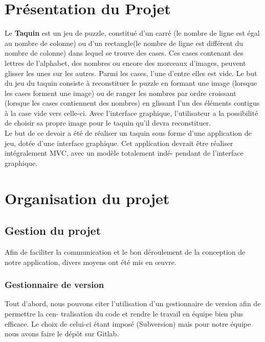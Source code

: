 \documentclass[12pt]{article}
\begin{document}
\tableofcontents
\newpage

\section{Présentation du Projet}
Le \textbf{Taquin} est un jeu de puzzle, constitué d’un carré (le nombre de ligne est égal au nombre de colonne) ou d'un rectangle(le nombre de ligne est différent du nombre de colonne) dans lequel se trouve des cases. Ces cases
contenant des lettres de l’alphabet, des nombres ou encore des morceaux d’images, peuvent glisser les
unes sur les autres. Parmi les cases, l’une d’entre elles est vide. Le but du jeu du taquin consiste à
reconstituer le puzzle en formant une image (lorsque les cases forment une image) ou de ranger les
nombres par ordre croissant (lorsque les cases contiennent des nombres) en glissant l’un des éléments
contigus à la case vide vers celle-ci. Avec l’interface graphique, l’utilisateur a la possibilité de choisir sa
propre image pour le taquin qu’il devra reconstituer.\\

Le but de ce devoir a été de réaliser un taquin sous forme d’une application de jeu, dotée d’une
interface graphique. Cet application devrait être réaliser intégralement MVC, avec un modèle totalement indé-
pendant de l'interface graphique.

\section{Organisation du projet}
\subsection{Gestion du projet}
Afin de faciliter la communication et le bon déroulement de la conception de notre application, divers
moyens ont été mis en œuvre.
\subsubsection{Gestionnaire de version}
Tout d’abord, nous pouvons citer l’utilisation d’un gestionnaire de version afin de permettre la cen-
tralisation du code et rendre le travail en équipe bien plus efficace. Le choix de celui-ci étant imposé
(Subversion) mais pour notre équipe nous avons faire le dépôt sur Gitlab.
\end{document}
